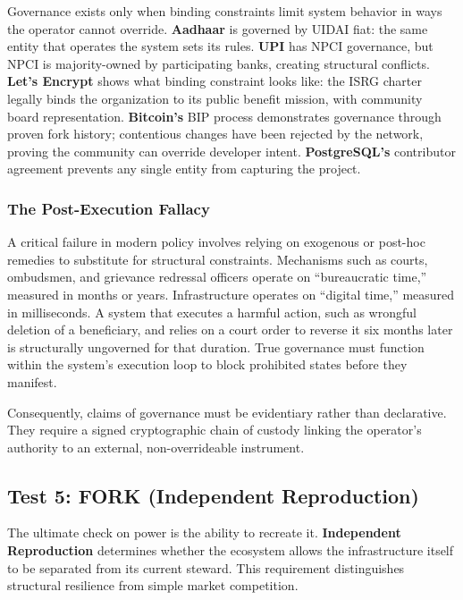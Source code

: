 Governance exists only when binding constraints limit system behavior in ways the operator cannot override. \textbf{Aadhaar} is governed by UIDAI fiat: the same entity that operates the system sets its rules. \textbf{UPI} has NPCI governance, but NPCI is majority-owned by participating banks, creating structural conflicts. \textbf{Let's Encrypt} shows what binding constraint looks like: the ISRG charter legally binds the organization to its public benefit mission, with community board representation. \textbf{Bitcoin's} BIP process demonstrates governance through proven fork history; contentious changes have been rejected by the network, proving the community can override developer intent. \textbf{PostgreSQL's} contributor agreement prevents any single entity from capturing the project.

\subsubsection{The Post-Execution Fallacy}
A critical failure in modern policy involves relying on exogenous or post-hoc remedies to substitute for structural constraints. Mechanisms such as courts, ombudsmen, and grievance redressal officers operate on ``bureaucratic time,'' measured in months or years. Infrastructure operates on ``digital time,'' measured in milliseconds. A system that executes a harmful action, such as wrongful deletion of a beneficiary, and relies on a court order to reverse it six months later is structurally ungoverned for that duration. True governance must function within the system's execution loop to block prohibited states before they manifest.

Consequently, claims of governance must be evidentiary rather than declarative. They require a signed cryptographic chain of custody linking the operator's authority to an external, non-overrideable instrument.

\subsection{Test 5: FORK (Independent Reproduction)}

The ultimate check on power is the ability to recreate it. \textbf{Independent Reproduction} determines whether the ecosystem allows the infrastructure itself to be separated from its current steward. This requirement distinguishes structural resilience from simple market competition.

